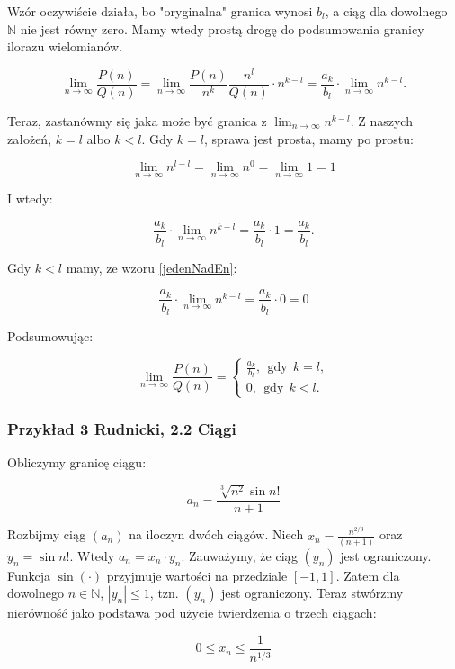 \documentclass[a4paper,oneside,openright,11pt]{article}
\numberwithin{equation}{section}
\begin{document}
Wzór oczywiście działa, bo "oryginalna" granica wynosi $b_l$, a ciąg dla dowolnego $\mathbb{N}$ nie jest równy zero. Mamy wtedy prostą drogę do podsumowania granicy ilorazu wielomianów.

\begin{equation*}
    \lim_{n\to\infty} \frac{P(n)}{Q(n)} = \lim_{n\to\infty} \frac{P(n)}{n^k} \frac{n^l}{Q(n)} \cdot n^{k-l} = \frac{a_k}{b_l} \cdot \lim_{n\to\infty} n^{k-l}.
\end{equation*}

\vspace{5mm}

Teraz, zastanówmy się jaka może być granica z $\lim_{n\to\infty} n^{k-l}$. Z naszych założeń, $k = l$ albo $k < l$. Gdy $k=l$, sprawa jest prosta, mamy po prostu:

\begin{equation*}
    \lim_{n\to\infty} n^{l-l} = \lim_{n\to\infty} n^{0} = \lim_{n\to\infty} 1 = 1
\end{equation*}

I wtedy: 

\begin{equation*}
    \frac{a_k}{b_l} \cdot \lim_{n\to\infty} n^{k-l} = \frac{a_k}{b_l} \cdot 1 = \frac{a_k}{b_l}.
\end{equation*}


Gdy $k < l$ mamy, ze wzoru \ref{jedenNadEn}:

\begin{equation*}
    \frac{a_k}{b_l} \cdot \lim_{n\to\infty} n^{k-l} = \frac{a_k}{b_l} \cdot 0 = 0
\end{equation*}

Podsumowując:

\begin{equation*}
    \lim_{n\to\infty} \frac{P(n)}{Q(n)} =
    \begin{cases}
        \frac{a_k}{b_l}, \ \ \mbox{gdy} \ \ k = l, \\
        0, \ \ \mbox{gdy} \ \ k < l.
    \end{cases}
\end{equation*}

\subsubsection{Przykład 3 Rudnicki, 2.2 Ciągi}

Obliczymy granicę ciągu:

\begin{equation*}
    a_n = \frac{\sqrt[3]{n^2} \sin n!}{n+1}
\end{equation*}


Rozbijmy ciąg $(a_n)$ na iloczyn dwóch ciągów. Niech $x_n = \frac{n^{2/3}}{(n+1)}$ oraz $y_n = \sin n!$. Wtedy $a_n = x_n \cdot y_n$. Zauważymy, że ciąg $(y_n)$ jest ograniczony.
Funkcja $\sin(\cdot)$ przyjmuje wartości na przedziale $[-1, 1]$. Zatem dla dowolnego $n \in \mathbb{N}$, $|y_n| \leq 1$, tzn. $(y_n)$ jest ograniczony. Teraz stwórzmy nierówność jako podstawa pod użycie
twierdzenia o trzech ciągach:

\begin{equation*}
    0 \leq x_n \leq \frac{1}{n^{1/3}}
\end{equation*}
\end{document}
